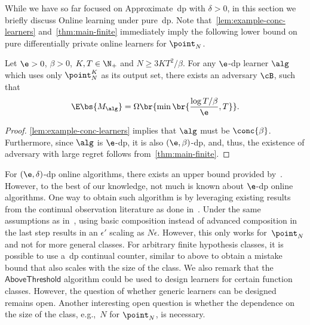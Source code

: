 
While we have so far focused on Approximate~\Gls{dp} with \(\delta > 0\), in this section we briefly discuss Online learning under pure~\Gls{dp}. 
Note that~\cref{lem:example-conc-learners} and~\cref{thm:main-finite} immediately imply the following lower bound on pure differentially private online learners for \(\point_N\).
\begin{corollary}\label{corr:pure-dp-lower}
    Let \(\e > 0\), \(\beta > 0\), \(K, T \in \N_+\) and \(N \geq 3KT^2 / \beta \).
    For any \(\e\)-\Gls{dp} learner \(\alg\) which uses only \(\point^K_N\) as its output set, 
    there exists an adversary \(\cB\), such that
    \begin{equation}
        \E \bs{M_{\alg}} = \Omega\br{\min\br{\frac{\log T / \beta}{\e}, T}}.
    \end{equation}
\end{corollary}
\begin{proof}
    \cref{lem:example-conc-learners} implies that \(\alg\) must be \(\conc{\beta}\). Furthermore, since \(\alg\) is \(\e\)-\Gls{dp}, it is also \((\e, \beta)\)-\Gls{dp},
    and, thus, the existence of adversary with large regret follows from~\cref{thm:main-finite}.
\end{proof}

For \((\e, \delta)\)-\Gls{dp} online algorithms, there exists an upper bound provided by~\citet{golowich2021littlestone}. However, to the best of our knowledge, not much is known about \(\e\)-\Gls{dp} online algorithms. One way to obtain such algorithm is by leveraging existing results from the continual observation literature as done in~. Under the same assumptions as in~, using basic composition instead of advanced composition in the last step results in an \(\epsilon'\) scaling as \(N\epsilon\). However, this only works for~\(\point_N\) and not for more general classes. For arbitrary finite hypothesis classes, it is possible to use a~\Gls{dp} continual counter, similar to above to obtain a mistake bound that also scales with the size of the class. We also remark that the \(\mathsf{AboveThreshold}\) algorithm could be used to design learners for certain function classes. However, the question of whether generic learners can be designed remains open. Another interesting open question is whether the dependence on the size of the class, e.g.,~\(N\) for \(\point_N\), is necessary.

